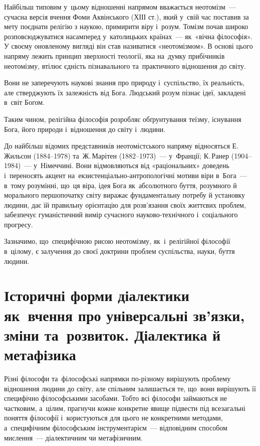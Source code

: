 \documentclass[a5paper,oneside,DIV=12,12pt,headings=small]{scrartcl}
\begin{document}
		Найбільш  типовим у~цьому відношенні  напрямом вважається неотомізм~— сучасна версія вчення Фоми Аквінського (ХІІІ ст.), який у~свій час  поставив за мету поєднати релігію з наукою, примирити віру і~розум. Томізм почав широко розповсюджуватися насамперед у~католицьких країнах~— як~«вічна філософія». У своєму оновленому вигляді він став називатися «неотомізмом».  В  основі цього напряму лежить принцип зверхності теології, яка на~думку прибічників неотомізму, втілює єдність пізнавального та~практичного відношення до світу.
		
		Вони не заперечують наукові знання про природу і~суспільство, їх реальність, але стверджують їх залежність  від Бога. Людський розум пізнає ідеї, закладені в~світ Богом.      
		
		Таким чином, релігійна філософія розробляє обґрунтування теїзму, існування Бога, його природи і~відношення до світу і~людини.
		
		До найбільш відомих представників неотомістського напряму відносяться Е.\,Жиль\-сон (1884–1978) та~Ж.\,Марітен (1882–1973)~— у~Франції; К.\,Ранер (1904–1984)~— у~Німеччині. Вони відмовляються від «раціональних» доведень і~переносять акцент на~ек\-зис\-тен\-ці\-аль\-но-ан\-тро\-по\-ло\-гіч\-ні мотиви віри в~Бога~— в~тому розумінні, що~ця віра, ідея Бога як~абсолютного буття, розумного й морального першопочатку світу виражає фундаментальну потребу й установку людини, дає їй правильну орієнтацію для розв'язання своїх життєвих проблем, забезпечує гуманістичний вимір сучасного на\-у\-ко\-во-тех\-ніч\-но\-го і~соціального прогресу.  
		
		Зазначимо, що~специфічною рисою неотомізму, як~і~релігійної філософії в~цілому, є залучення до своєї доктрини проблем суспільства, науки, буття людини.
		
	\section{Історичні форми діалектики як~вчення про універсальні зв'язки, зміни та~розвиток. Діалектика й метафізика}
		Різні філософи та~філософські напрямки по-різному вирішують проблему відношення людини до світу, але спільним залишається те, що~вони вирішують її специфічно філософськими засобами. Тобто всі філософи займаються не частковим, а~цілим, прагнучи кожне конкретне явище підвести під всезагальні поняття філософії і~користуються для цього не конкретними методами, а~специфічним філософським інструментарієм~— відповідним способом мислення~— діалектичним чи метафізичним.
		
\end{document}

